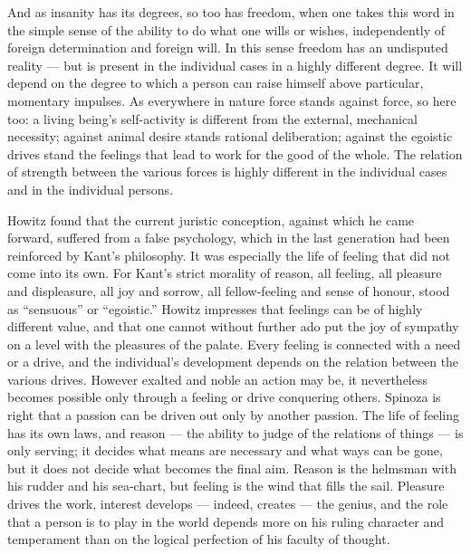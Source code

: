 \documentclass[12pt,a4paper]{book}
\newcommand{\opage}[1]{\marginnote{\footnotesize\textit{[#1]}}}
\begin{document}
And as insanity has its degrees, so too has freedom, when one takes this word in the
simple sense of the ability to do what one wills or wishes, independently of foreign
determination and foreign will. In this sense freedom has an undisputed reality --- but is
present in the individual cases in a highly different degree. It will depend on the degree
to which a person can raise himself above particular, momentary impulses. As everywhere in
nature force stands against force, so here too: a living being's self-activity is
different from the external, mechanical necessity; against animal desire stands rational
deliberation; against the egoistic drives stand the feelings that lead to work for the
good of the whole. The relation of strength between \opage{84}the various forces is highly different
in the individual cases and in the individual persons.

Howitz found that the current juristic conception, against which he came forward, suffered
from a false psychology, which in the last generation had been reinforced by Kant's
philosophy. It was especially the life of feeling that did not come into its own. For
Kant's strict morality of reason, all feeling, all pleasure and displeasure, all joy and
sorrow, all fellow-feeling and sense of honour, stood as ``sensuous'' or ``egoistic.''
Howitz impresses that feelings can be of highly different value, and that one cannot
without further ado put the joy of sympathy on a level with the pleasures of the palate.
Every feeling is connected with a need or a drive, and the individual's development depends
on the relation between the various drives. However exalted and noble an action may be, it
nevertheless becomes possible only through a feeling or drive conquering others. Spinoza is
right that a passion can be driven out only by another passion. The life of feeling has its
own laws, and reason --- the ability to judge of the relations of things --- is only
serving; it decides what means are necessary and what ways can be gone, but it does not
decide what becomes the final aim. Reason is the helmsman with his rudder and his
sea-chart, but feeling is the wind that fills the sail. Pleasure drives the work, interest
develops --- indeed, creates --- the genius, and the role that a person is to play in the
world depends more on his ruling character and temperament than on the logical perfection
of his faculty of thought.
\end{document}
